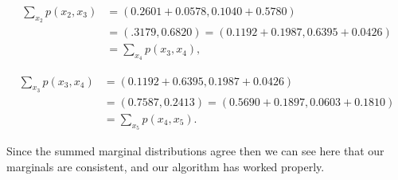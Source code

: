 \documentclass[paper=a4, fontsize=11pt]{scrartcl} %
\begin{document}
\begin{align}
\sum_{x_2} p(x_2,x_3) &= (0.2601+0.0578,0.1040+0.5780) \\
&= (.3179,0.6820) = (0.1192+0.1987,0.6395+0.0426) \\ 
&= \sum_{x_4} p(x_3,x_4),
\end{align}

\begin{align}
\sum_{x_3} p(x_3,x_4) &= (0.1192+0.6395,0.1987+0.0426) \\
&= (0.7587,0.2413) = (0.5690+0.1897,0.0603+0.1810) \\ 
&= \sum_{x_5} p(x_4,x_5).
\end{align}

Since the summed marginal distributions agree then we can see here that our marginals are consistent, and our algorithm has worked properly.
\end{document}
